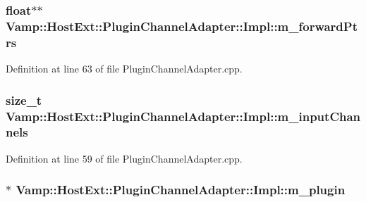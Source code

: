 \subsubsection[{\texorpdfstring{m\+\_\+forward\+Ptrs}{m_forwardPtrs}}]{ float$\ast$$\ast$ Vamp\+::\+Host\+Ext\+::\+Plugin\+Channel\+Adapter\+::\+Impl\+::m\+\_\+forward\+Ptrs\hspace{0.3cm}{\ttfamily [protected]}}\hypertarget{class_vamp_1_1_host_ext_1_1_plugin_channel_adapter_1_1_impl_a882147731ba96cf5da446265dbce11bd}{}\label{class_vamp_1_1_host_ext_1_1_plugin_channel_adapter_1_1_impl_a882147731ba96cf5da446265dbce11bd}


Definition at line 63 of file Plugin\+Channel\+Adapter.\+cpp.

\subsubsection[{\texorpdfstring{m\+\_\+input\+Channels}{m_inputChannels}}]{\setlength{\rightskip}{0pt plus 5cm}size\+\_\+t Vamp\+::\+Host\+Ext\+::\+Plugin\+Channel\+Adapter\+::\+Impl\+::m\+\_\+input\+Channels\hspace{0.3cm}{\ttfamily [protected]}}\hypertarget{class_vamp_1_1_host_ext_1_1_plugin_channel_adapter_1_1_impl_a6e32d1564be175506a4d43dbfb8e3ace}{}\label{class_vamp_1_1_host_ext_1_1_plugin_channel_adapter_1_1_impl_a6e32d1564be175506a4d43dbfb8e3ace}


Definition at line 59 of file Plugin\+Channel\+Adapter.\+cpp.

\subsubsection[{\texorpdfstring{m\+\_\+plugin}{m_plugin}}]{$\ast$ Vamp\+::\+Host\+Ext\+::\+Plugin\+Channel\+Adapter\+::\+Impl\+::m\+\_\+plugin\hspace{0.3cm}{\ttfamily [protected]}}\hypertarget{class_vamp_1_1_host_ext_1_1_plugin_channel_adapter_1_1_impl_aff31c1cf3a0fb18ddab7e3ab213c3c07}{}\label{class_vamp_1_1_host_ext_1_1_plugin_channel_adapter_1_1_impl_aff31c1cf3a0fb18ddab7e3ab213c3c07}


